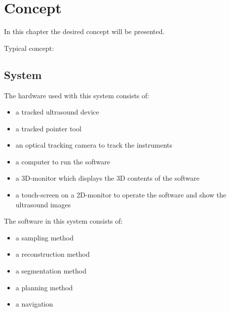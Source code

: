 \chapter{Concept}
In this chapter the desired concept will be presented. 

Typical concept: \cite{payan2012soft}
\section{System}
The hardware used with this system consists of:
\begin{itemize}
  \item a tracked ultrasound device
  \item a tracked pointer tool
  \item an optical tracking camera to track the instruments
  \item a computer to run the software
  \item a 3D-monitor which displays the 3D contents of the software 
  \item a touch-screen on a 2D-monitor to operate the software and show the
    ultrasound images
\end{itemize}
The software in this system consists of:
\begin{itemize}
  \item a sampling method 
  \item a reconstruction method 
  \item a segmentation method 
  \item a planning method 
  \item a navigation 
\end{itemize}

